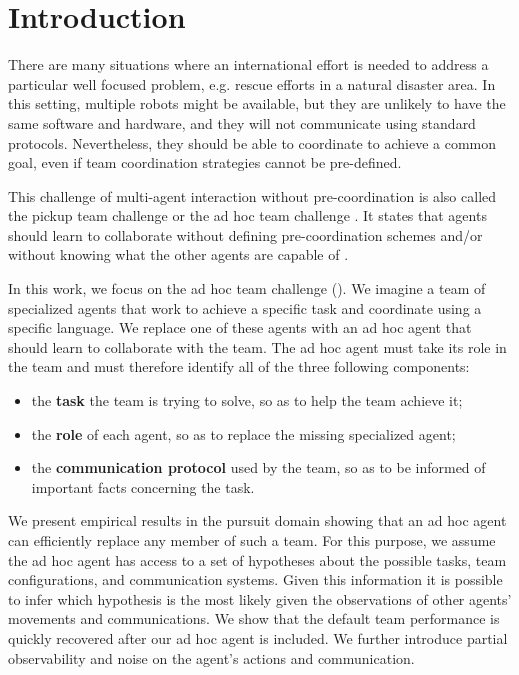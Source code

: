 \section{Introduction}


There are many situations where an international effort is needed to address a particular well focused problem, e.g. rescue efforts in a natural disaster area. In this setting, multiple robots might be available, but they are unlikely to have the same software and hardware, and they will not communicate using standard protocols. Nevertheless, they should be able to coordinate to achieve a common goal, even if team coordination strategies cannot be pre-defined.

This challenge of multi-agent interaction without pre-coordination is also called the pickup team challenge \cite{gil2006dynamically} or the ad hoc team challenge \cite{stone2010ad}. It states that agents should learn to collaborate without defining pre-coordination schemes and/or without knowing what the other agents are capable of \cite{bowling2005coordination,gil2006dynamically,stone2010ad}.

In this work, we focus on the ad hoc team challenge (\cite{stone2010ad}). We imagine a team of specialized agents that work to achieve a specific task and coordinate using a specific language. We replace one of these agents with an ad hoc agent that should learn to collaborate with the team. The ad hoc agent must take its role in the team and must therefore identify all of the three following components:
%
\begin{itemize}
\item the \textbf{task} the team is trying to solve, so as to help the team achieve it;
\item the \textbf{role} of each agent, so as to replace the missing specialized agent;
\item the \textbf{communication protocol} used by the team, so as to be informed of important facts concerning the task.
\end{itemize}
%
We present empirical results in the pursuit domain showing that an ad hoc agent can efficiently replace any member of such a team. For this purpose, we assume the ad hoc agent has access to a set of hypotheses about the possible tasks, team configurations, and communication systems. Given this information it is possible to infer which hypothesis is the most likely given the observations of other agents' movements and communications. We show that the default team performance is quickly recovered after our ad hoc agent is included. We further introduce partial observability and noise on the agent's actions and communication.

